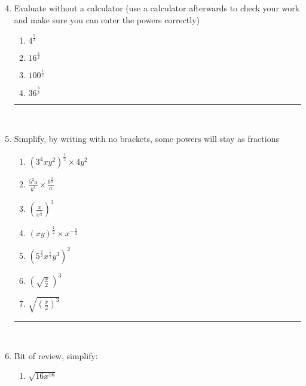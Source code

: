 \documentclass[a4paper,12pt]{article}
\newcommand\questionend{
	\rule[0pt]{17cm}{0.5pt}\vspace{-0.5cm}\\
}
\begin{document}
\begin{enumerate}[label=\normalsize \arabic*)~~~ , leftmargin=1cm]
		\setcounter{enumi}{3}
\item Evaluate without a calculator (use a calculator afterwards to check your work and make sure you can enter the powers correctly)
\begin{multicols}{4}
	\begin{enumerate}[label=\normalsize \alph*)~~~ , topsep=8pt,itemsep=5pt,partopsep=4pt, parsep=4pt]
		\item $\displaystyle 4^{ \frac{5}{2} } $
		\item  $\displaystyle 16^{ \frac{3}{2} } $
		\item  $\displaystyle100^{ \frac{7}{2} }$
		\item $\displaystyle 36^{ \frac{3}{2} } $
	\end{enumerate}
\end{multicols}
\questionend
\item Simplify, by writing with no brackets, some powers will stay as fractions
\begin{multicols}{2}
	\begin{enumerate}[label=\normalsize \alph*)~~~ , topsep=8pt,itemsep=5pt,partopsep=4pt, parsep=4pt]
			\item $\displaystyle \left( 3^4xy^2 \right)^{ \frac{1}{2} } \times 4y^2 $
			\item  $\displaystyle \frac{5^2a}{b^4} \times \frac{b ^ {\frac{3}{2}}}{a} $
			\item  $\displaystyle \left( \frac{x}{ x^\frac{1}{2} } \right)^3$
			\item $\displaystyle \left( xy \right)^\frac{1}{2} \times x^{ -\frac{5}{2} }  $
			\item $\displaystyle  \left(  5^\frac{3}{2}  x^{ \frac{5}{2}  } y^3 \right)^2$
			\item $\displaystyle  \left( \sqrt{ \frac{x}{2} }~ \right)^3$
			\item $\displaystyle  \sqrt{   \left(   \frac{x}{2}  \right) ^3   }$
	\end{enumerate}
\end{multicols}
\questionend
\item Bit of review, simplify:
\begin{multicols}{3}
	\begin{enumerate}[label=\normalsize \alph*)~~~ , topsep=8pt,itemsep=5pt,partopsep=4pt, parsep=4pt]
		\item $\displaystyle\sqrt{16x^{16}}$\\

\end{enumerate}
\end{multicols}
\end{enumerate}
\end{document}
